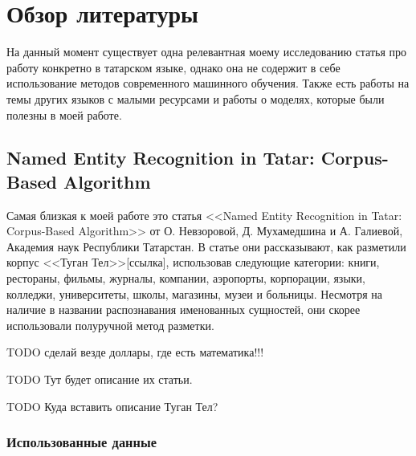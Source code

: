 \section{Обзор литературы}

На данный момент существует одна релевантная моему исследованию статья про работу конкретно в татарском языке, однако она не содержит в себе использование методов современного машинного обучения. Также есть работы на темы других языков с малыми ресурсами и работы о моделях, которые были полезны в моей работе.

\subsection{Named Entity Recognition in Tatar: Corpus-Based Algorithm}

Самая близкая к моей работе это статья <<Named Entity Recognition in Tatar:
Corpus-Based Algorithm>> от О. Невзоровой, Д. Мухамедшина и А. Галиевой, Академия наук Республики Татарстан. В статье они рассказывают, как разметили корпус <<Туган Тел>>[ссылка], использовав следующие категории: книги, рестораны, фильмы, журналы, компании, аэропорты, корпорации, языки, колледжи, университеты, школы, магазины, музеи и больницы. Несмотря на наличие в названии распознавания именованных сущностей, они скорее использовали полуручной метод разметки. 

TODO сделай везде доллары, где есть математика!!!

TODO Тут будет описание их статьи.

TODO Куда вставить описание Туган Тел?

\subsubsection{Использованные данные}

